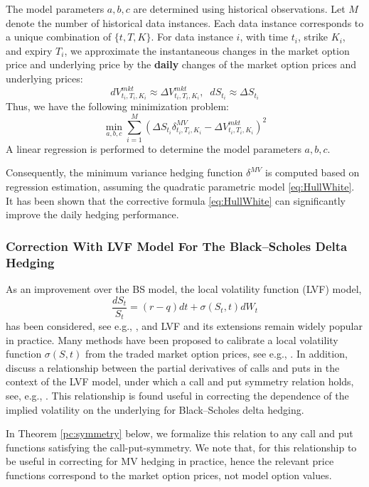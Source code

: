 \documentclass[letterpaper,12pt,titlepage,oneside,final]{book}
\numberwithin{equation}{section}
\theoremstyle{definition}
\newcommand{\Vmkt}{V^{mkt}}
\newcommand{\Smkt}{S}
\begin{document}
The model parameters $a,b,c$ are determined using historical observations.
Let $M$ denote the number of historical data instances. Each data instance corresponds to a unique combination of $\{t,T,K\}$. For data instance $i$, with time $t_i$, strike $K_i$, and expiry $T_i$, we approximate the instantaneous changes in the market option price and underlying price by the \textbf{daily} changes of the market option prices and underlying prices:
\[
    d\Vmkt_{t_i,T_i,K_i} \approx \Delta \Vmkt_{t_i,T_i,K_i},\;\;
    d\Smkt_{t_i} \approx \Delta S_{t_i}
\]
Thus, we have the following minimization problem:
\[
\min_{a,b,c} \sum_{i=1}^M \left(\Delta S_{t_i} \delta^{MV}_{t_i,T_i,K_i} -\Delta \Vmkt_{t_i,T_i,K_i}   \right)^2
\]
A linear regression is performed to determine the model parameters $a,b,c$.

 Consequently, the minimum variance hedging function $ \delta^{MV}$ is computed based on regression estimation, assuming 
 the quadratic parametric model \eqref{eq:HullWhite}.
 It has been shown \cite{hulloptimal} that the corrective formula \eqref{eq:HullWhite} can significantly improve the daily hedging performance.

 \subsubsection{Correction With LVF Model For  The Black–Scholes Delta Hedging}
 As an improvement over the BS model, the local volatility function (LVF) model,
 \begin{equation}\label{LVF}
\frac{dS_t}{S_t} = (r-q) dt + \sigma(S_t,t)   dW_t
\end{equation}
 has been considered, see e.g., \citep{Dupire94,DermanKani94,DermanKani96},
  and LVF and its extensions remain widely popular in practice. Many methods have been proposed to calibrate a local volatility function $\sigma(S,t)$ from the traded market option prices, see e.g., \citep{JackwerthRubenstein96,Andersen-etal98,CLV98}. In addition, \citet{coleman2001} discuss a relationship between the partial derivatives of  calls and puts in the context of the LVF model, under which a call and put symmetry relation holds, see,  e.g., \citep{Carr94,Carr98}. This relationship is found useful in correcting the dependence of the implied volatility on the underlying for Black–Scholes delta hedging.

In Theorem \ref{pc:symmetry} below, we formalize this relation \citep{coleman2001} to any call and put functions satisfying the call-put-symmetry. We note that, for this relationship to be useful in correcting for MV hedging in practice, hence the relevant price functions  correspond to the market option prices, not model option values.
\end{document}
